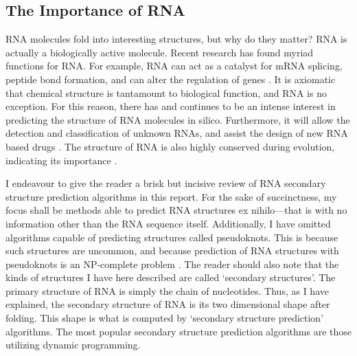 \documentclass[12pt, a4paper]{article}
\begin{document}
\subsection{The Importance of RNA}

RNA molecules fold into interesting structures, but why do they matter? RNA is actually a biologically active molecule. Recent research has found myriad functions for RNA. For example, RNA can act as a catalyst for mRNA splicing, peptide bond formation, and can alter the regulation of genes
\cite{xu2012statistical}. It is axiomatic that chemical structure is tantamount to biological function, and RNA is no exception. For this reason, there has and continues to be an intense
interest in predicting the structure of RNA
molecules in silico. Furthermore, it will allow the detection and classification of unknown RNAs, and assist the design of new RNA based drugs \cite{condon2003problems}. The structure of RNA
is also highly conserved during evolution, indicating its importance \cite{hofacker2008rna}.

I endeavour to give the reader a brisk but incisive review of RNA secondary structure prediction algorithms in this report. For the sake of succinctness, my focus shall be methods able to predict RNA structures ex nihilo---that is with no information other than the RNA sequence itself. Additionally, I have omitted algorithms capable of predicting structures called pseudoknots. This is because such structures are uncommon, and because prediction of RNA structures with pseudoknots is an NP-complete problem \cite{lyngso2000rna}. The reader should also note that the kinds of structures I have here described are called `secondary structures'. The primary structure of RNA is simply the chain of nucleotides. Thus, as I have explained, the secondary structure of RNA is its two dimensional shape after folding. This shape is what is computed by `secondary structure prediction' algorithms. The most popular secondary structure prediction algorithms are those utilizing dynamic programming.
\end{document}
